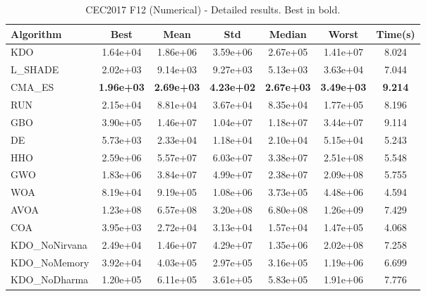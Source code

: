 \begin{table}[H]
\centering\small
\caption{CEC2017 F12 (Numerical) - Detailed results. Best in bold.}
\label{tab:cec2017_F12}
\begin{tabular}{lcccccc}
\toprule
\textbf{Algorithm} & \textbf{Best} & \textbf{Mean} & \textbf{Std} & \textbf{Median} & \textbf{Worst} & \textbf{Time(s)} \\
\midrule
KDO & 1.64e+04 & 1.86e+06 & 3.59e+06 & 2.67e+05 & 1.41e+07 & 8.024 \\
L_SHADE & 2.02e+03 & 9.14e+03 & 9.27e+03 & 5.13e+03 & 3.63e+04 & 7.044 \\
CMA_ES & \textbf{1.96e+03} & \textbf{2.69e+03} & \textbf{4.23e+02} & \textbf{2.67e+03} & \textbf{3.49e+03} & \textbf{9.214} \\
RUN & 2.15e+04 & 8.81e+04 & 3.67e+04 & 8.35e+04 & 1.77e+05 & 8.196 \\
GBO & 3.90e+05 & 1.46e+07 & 1.04e+07 & 1.18e+07 & 3.44e+07 & 9.114 \\
DE & 5.73e+03 & 2.33e+04 & 1.18e+04 & 2.10e+04 & 5.15e+04 & 5.243 \\
HHO & 2.59e+06 & 5.57e+07 & 6.03e+07 & 3.38e+07 & 2.51e+08 & 5.548 \\
GWO & 1.83e+06 & 3.84e+07 & 4.99e+07 & 2.38e+07 & 2.09e+08 & 5.755 \\
WOA & 8.19e+04 & 9.19e+05 & 1.08e+06 & 3.73e+05 & 4.48e+06 & 4.594 \\
AVOA & 1.23e+08 & 6.57e+08 & 3.20e+08 & 6.80e+08 & 1.26e+09 & 7.429 \\
COA & 3.95e+03 & 2.72e+04 & 3.13e+04 & 1.57e+04 & 1.47e+05 & 4.068 \\
KDO_NoNirvana & 2.49e+04 & 1.46e+07 & 4.29e+07 & 1.35e+06 & 2.02e+08 & 7.258 \\
KDO_NoMemory & 3.92e+04 & 4.03e+05 & 2.97e+05 & 3.16e+05 & 1.19e+06 & 6.699 \\
KDO_NoDharma & 1.20e+05 & 6.11e+05 & 3.61e+05 & 5.83e+05 & 1.91e+06 & 7.776 \\
\bottomrule
\end{tabular}
\end{table}
